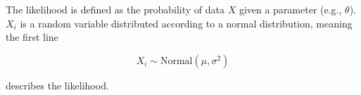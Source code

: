 The likelihood is defined as the probability of data $X$ given a parameter (e.g., $\theta$). $X_i$ is a random variable distributed according to a normal distribution, meaning the first line

\[
    X_i \sim \text{Normal}(\mu, \sigma^2)
\]

describes the likelihood.